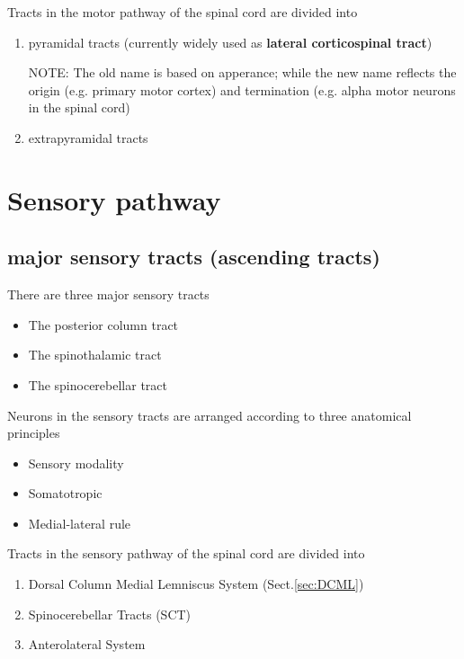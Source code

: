 Tracts in the motor pathway of the spinal cord are divided into
\begin{enumerate}
  \item pyramidal tracts (currently widely used as {\bf  lateral corticospinal
  tract})

NOTE: The old name is based on apperance; while the new name reflects the origin
(e.g. primary motor cortex) and termination (e.g. alpha motor neurons in the
spinal cord)

  \item extrapyramidal tracts
\end{enumerate}

\section{Sensory pathway}
\label{sec:sensory-pathway}
\label{sec:sensory-tracts}

\subsection{major sensory tracts (ascending tracts)}
\label{sec:sensory-tracts}

There are three major sensory tracts
\begin{itemize}
  \item The posterior column tract
  \item The spinothalamic tract
  \item The spinocerebellar tract
\end{itemize}

Neurons in the sensory tracts are arranged
according to three anatomical principles
\begin{itemize}
  \item  Sensory modality
  \item  Somatotropic
  \item  Medial-lateral rule
\end{itemize}



Tracts in the sensory pathway of the spinal cord are divided into
\begin{enumerate}
  \item Dorsal Column Medial Lemniscus System (Sect.\ref{sec:DCML})
  \item Spinocerebellar Tracts (SCT)
  \item Anterolateral System
\end{enumerate}

